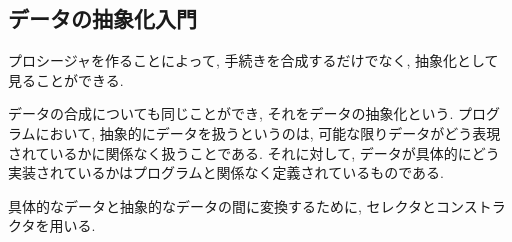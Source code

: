 \setcounter{section}{2}
\setcounter{subsection}{0}
%
\subsection{データの抽象化入門}
プロシージャを作ることによって, 手続きを合成するだけでなく,
抽象化として見ることができる.

データの合成についても同じことができ, それをデータの抽象化という.
プログラムにおいて, 抽象的にデータを扱うというのは,
可能な限りデータがどう表現されているかに関係なく扱うことである.
それに対して, データが具体的にどう実装されているかはプログラムと関係なく定義されているものである.

具体的なデータと抽象的なデータの間に変換するために, セレクタとコンストラクタを用いる.
%

%

%

